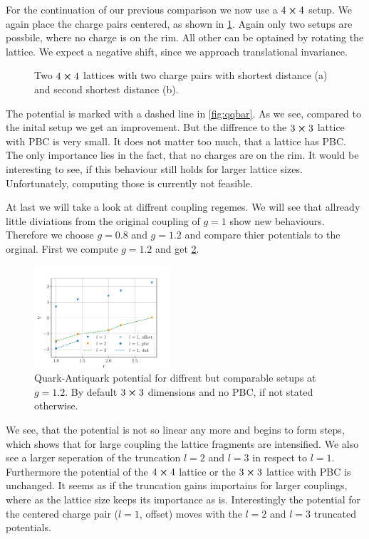 For the continuation of our previous comparison we now use a $4\cross4$ setup. We again place the charge pairs centered, as shown in \cref{fig:4x4v1}. Again only two setups are possbile, where no charge is on the rim. All other can be optained by rotating the lattice.
We expect a negative shift, since we approach translational invariance.
\begin{figure}[h]
	\begin{center}
		\subfloat[]{
			\scalebox{0.7}{
				
			}
		}
		\subfloat[]{
			\scalebox{0.7}{
				
			}
		}
		\caption{Two $4\cross 4$ lattices with two charge pairs with shortest distance (a) and second shortest distance (b).}\label{fig:4x4v1}
	\end{center}
\end{figure}

The potential is marked with a dashed line in \cref{fig:qqbar}. As we see, compared to the inital setup we get an improvement. But the diffrence to the $3\cross 3$ lattice with PBC is very small. It does not matter too much, that a lattice has PBC. The only importance lies in the fact, that no charges are on the rim. It would be interesting to see, if this behaviour still holds for larger lattice sizes. Unfortunately, computing those is currently not feasible.


At last we will take a look at diffrent coupling regemes. We will see that allready little diviations from the original coupling of $g=1$ show new behaviours. Therefore we choose $g=0.8$ and $g=1.2$ and compare thier potentials to the orginal.
First we compute $g=1.2$ and get \cref{fig:qqbarl}. 
\begin{figure}[h]
	\begin{center}
		\includegraphics[width=0.45\textwidth]{images/quark_antiquark_potential_large_g.pdf}
	\end{center}
  \caption{Quark-Antiquark potential for diffrent but comparable setups at $g=\num{1.2}$. By default $3\cross3$ dimensions and no PBC, if not stated otherwise.}\label{fig:qqbarl}
\end{figure}
We see, that the potential is not so linear any more and begins to form steps, which shows that for large coupling the lattice fragments are intensified.
We also see a larger seperation of the truncation $l=2$ and $l=3$ in respect to $l=1$. Furthermore the potential of the $4\cross4$ lattice or the $3\cross3$ lattice with PBC is unchanged. It seems as if the truncation gains importains for larger couplings, where as the lattice size keeps its importance as is. Interestingly the potential for the centered charge pair ($l=1$, offset) moves with the $l=2$ and $l=3$ truncated potentials.

